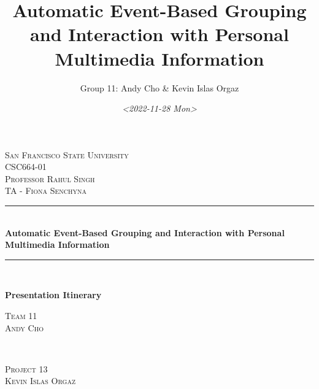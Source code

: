 \documentclass[11pt]{article}
\author{Group 11: Andy Cho \& Kevin Islas Orgaz}
\date{\textit{<2022-11-28 Mon>}}
\title{Automatic Event-Based Grouping and Interaction with Personal Multimedia Information}
\begin{document}

\begin{titlepage} %
	\newcommand{\HRule}{\rule{\linewidth}{0.5mm}} %
	
	\center %
	
	
	\textsc{\LARGE San Francisco State University}\\[1.5cm]
	\textsc{\Large CSC664-01}\\[0.5cm]
	
	
	\textsc{\large Professor Rahul Singh}\\[0.5cm]
	\textsc{\large TA - Fiona Senchyna}\\[0.3cm]
	
	
	\HRule\\[0.4cm]
	{\huge\bfseries  Automatic Event-Based Grouping and Interaction with Personal Multimedia Information}\\[0.1cm] %
	\HRule\\[0.4cm]
	

	
	\begin{minipage}{0.4\textwidth}
	{\huge\bfseries  Presentation Itinerary}\\[0.5cm] %
	\end{minipage}
	
	
	\begin{minipage}{0.4\textwidth}
		\begin{flushleft}
			\textsc{Team 11}\\
			\textsc{Andy Cho}\\
		\end{flushleft}
	\end{minipage}
	~
	\begin{minipage}{0.4\textwidth}
		\begin{flushright}
			\textsc{Project 13}\\
			\textsc{Kevin Islas Orgaz}\\
		\end{flushright}
	\end{minipage}
	

\end{titlepage}
\end{document}

